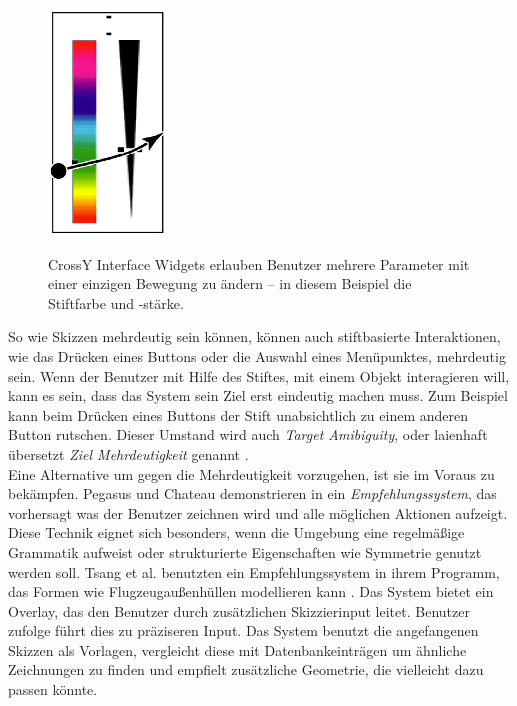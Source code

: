 \begin{figure}[bth]
	\begin{center}
	
	{\includegraphics[width=0.3\linewidth]{gfx/accotCrossY}}
	\caption[CrossY]{CrossY Interface Widgets erlauben Benutzer mehrere Parameter mit einer einzigen Bewegung zu ändern -- in diesem Beispiel die Stiftfarbe und -stärke.}
	\label{fig:accotCrossY}
	\end{center}
\end{figure}

\medskip So wie Skizzen mehrdeutig sein können, können auch stiftbasierte Interaktionen, wie das Drücken eines Buttons oder die Auswahl eines Menüpunktes, mehrdeutig sein. Wenn der Benutzer mit Hilfe des Stiftes, mit einem Objekt interagieren will, kann es sein, dass das System sein Ziel erst eindeutig machen muss. Zum Beispiel kann beim Drücken eines Buttons der Stift unabsichtlich zu einem anderen Button rutschen. Dieser Umstand wird auch \emph{Target Amibiguity}, oder laienhaft übersetzt \emph{Ziel Mehrdeutigkeit} genannt \citep{Mankoff:2000p77,Mankoff:2000}. \\
Eine Alternative um gegen die Mehrdeutigkeit vorzugehen, ist sie im Voraus zu bekämpfen. Pegasus und Chateau demonstrieren in \citep{Igarashi:2001,Igarashi:2003} ein \emph{Empfehlungssystem}, das vorhersagt was der Benutzer zeichnen wird und alle möglichen Aktionen aufzeigt. Diese Technik eignet sich besonders, wenn die Umgebung eine regelmäßige Grammatik aufweist oder strukturierte Eigenschaften wie Symmetrie genutzt werden soll.
Tsang et al. benutzten ein Empfehlungssystem in ihrem Programm, das Formen wie Flugzeugaußenhüllen modellieren kann \citep{Tsang:2004}. Das System bietet ein Overlay, das den Benutzer durch zusätzlichen Skizzierinput leitet. Benutzer zufolge führt dies zu präziseren Input. Das System benutzt die angefangenen Skizzen als Vorlagen, vergleicht diese mit Datenbankeinträgen um ähnliche Zeichnungen zu finden und empfielt zusätzliche Geometrie, die vielleicht dazu passen könnte.

